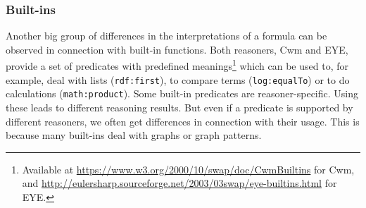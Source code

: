 % 
% 
\subsubsection{Built-ins}
%  
Another big group of differences in the interpretations of a formula can be observed in connection with built-in functions.
Both reasoners, Cwm and EYE, provide 
a set of predicates with predefined meanings\footnote{Available at  \url{https://www.w3.org/2000/10/swap/doc/CwmBuiltins} for Cwm, and 
\url{http://eulersharp.sourceforge.net/2003/03swap/eye-builtins.html} for EYE.}
which can be used to, for example, deal with lists (\texttt{rdf:first}), to compare terms (\texttt{log:equalTo}) or to do calculations (\texttt{math:product}). 
Some built-in predicates are reasoner-specific. Using these leads to different reasoning results. %
But even if a
predicate is supported by different reasoners, we often get differences in connection with their usage.
This is because many built-ins deal with graphs or graph patterns. %


